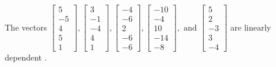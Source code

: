 \begin{exercise}
\begin{exerciseStatement}
  \end{exerciseStatement}
  \begin{exerciseAnswer}
   The vectors \(\left[\begin{array}{r}
5 \\
-5 \\
4 \\
5 \\
1
\end{array}\right] , \left[\begin{array}{r}
3 \\
-1 \\
-4 \\
4 \\
1
\end{array}\right] , \left[\begin{array}{r}
-4 \\
-6 \\
2 \\
-6 \\
-6
\end{array}\right] , \left[\begin{array}{r}
-10 \\
-4 \\
10 \\
-14 \\
-8
\end{array}\right] , \text{ and } \left[\begin{array}{r}
5 \\
2 \\
-3 \\
3 \\
-4
\end{array}\right]\) are 
  	 linearly dependent  .
  


  \end{exerciseAnswer}
\end{exercise}